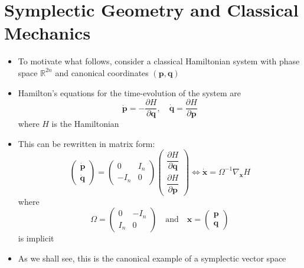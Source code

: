 \documentclass[12pt,a4paper]{article}
\numberwithin{equation}{section}
\begin{document}
	\section{Symplectic Geometry and Classical Mechanics}
	\begin{itemize}
		\item To motivate what follows, consider a classical Hamiltonian system with phase space $\mathbb{R}^{2n}$ and canonical coordinates $(\mathbf{p},\mathbf{q})$
		\item Hamilton's equations for the time-evolution of the system are
		\begin{equation}
			\dot{\mathbf{p}}=-\frac{\partial H}{\partial \mathbf{q}},\quad\dot{\mathbf{q}}=\frac{\partial H}{\partial \mathbf{p}}
		\end{equation}
		where $H$ is the Hamiltonian
		\item This can be rewritten in matrix form:
		\begin{equation}
			\begin{pmatrix}\dot{\mathbf{p}}\\\dot{\mathbf{q}}\end{pmatrix}=\begin{pmatrix}0&I_{n}\\-I_{n}&0\end{pmatrix}\begin{pmatrix}\dfrac{\partial H}{\partial \mathbf{q}}\\[1em]\dfrac{\partial H}{\partial \mathbf{p}}\end{pmatrix}\iff \dot{\mathbf{x}}=\Omega^{-1}\nabla_{\mathbf{x}}H
		\end{equation}
		where
		\begin{equation}
			\Omega=\begin{pmatrix}
				0&-I_{n}\\I_{n}&0
			\end{pmatrix}\quad\text{and}\quad\mathbf{x}=\begin{pmatrix}
			\mathbf{p}\\\mathbf{q}
		\end{pmatrix}
		\end{equation}
		is implicit
		\item As we shall see, this is the canonical example of a symplectic vector space
	\end{itemize}
\end{document}
